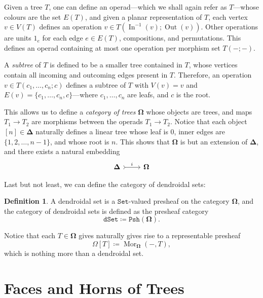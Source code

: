 \documentclass[11pt, reqno]{amsart}
\theoremstyle{definition}
\newtheorem{definition}[theorem]{Definition}
\newcommand{\catfont}{\texttt}
\newcommand{\Set}{{\catfont{Set}}}          %
\newcommand{\Psh}[1]{{\catfont{Psh}({#1})}}   %
\DeclareMathOperator{\Mor}{Mor}   %
\newcommand{\Splx}{{\mathbf{\Delta}}}           %
\newcommand{\Tree}{{\mathbf{\Omega}}}
\DeclareMathOperator{\Input}{In}
\DeclareMathOperator{\Output}{Out}
\newcommand{\dSet}{{\catfont{dSet}}}
\begin{document}
Given a tree \(T\), one can define an operad---which we shall again refer as
\(T\)---whose colours are the set \(E(T)\), and given a planar representation
of \(T\), each vertex \(v \in V(T)\) defines an operation \(v \in
T(\Input^{-1}(v); \Output(v))\). Other operations are units \(1_e\) for each
edge \(e \in E(T)\), compositions, and permutations. This defines an operad
containing at most one operation per morphism set \(T(-; -)\).

A \emph{subtree} of \(T\) is defined to be a smaller tree contained in \(T\),
whose vertices contain all incoming and outcoming edges present in \(T\).
Therefore, an operation \(v \in T(c_1, \dots, c_n; c)\) defines a
subtree of \(T\) with \(V(v) = v\) and \(E(v) = \{c_1, \dots, c_n,
c\}\)---where \(c_1, \dots, c_n\) are leafs, and \(c\) is the root.

This allows us to define a \emph{category of trees} \(\Tree\) whose objects are
trees, and maps \(T_1 \to T_2\) are morphisms between the operads \(T_1 \to
T_2\). Notice that each object \([n] \in \Splx\) naturally defines a linear
tree whose leaf is \(0\), inner edges are \(\{1, 2, \dots, n-1\}\), and whose
root is \(n\). This shows that \(\Tree\) is but an extension of \(\Splx\), and
there exists a natural embedding
\[
    \begin{tikzcd}
        \Splx \ar[r, "i", tail] &\Tree
    \end{tikzcd}
\]

Last but not least, we can define the category of dendroidal sets:

\begin{definition}\label{def:dendroidal-sets}
A dendroidal set is a \(\Set\)-valued presheaf on the category \(\Tree\), and
the category of dendroidal sets is defined as the presheaf category
\[
    \dSet \coloneq \Psh{\Tree}.
\]
\end{definition}

Notice that each \(T \in \Tree\) gives naturally gives rise to a representable
presheaf 
\[
    \Omega[T] \coloneq \Mor_{\Tree}(-, T),
\]
which is nothing more than a dendroidal set.

\section{Faces and Horns of Trees}
\end{document}
